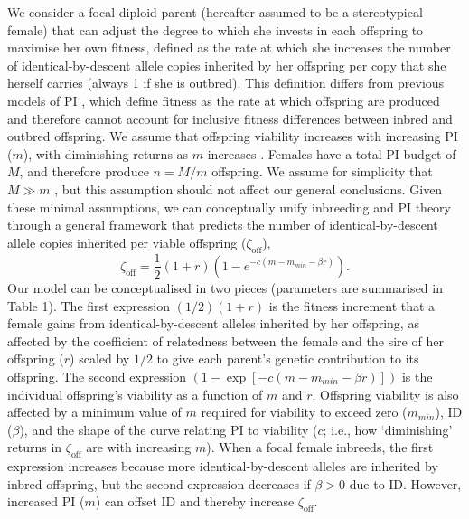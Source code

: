 \documentclass[10pt,letterpaper]{article}
\begin{document}
We consider a focal diploid parent (hereafter assumed to be a stereotypical female) that can adjust the degree to which she invests in each offspring to maximise her own fitness, defined as the rate at which she increases the number of identical-by-descent allele copies inherited by her offspring per copy that she herself carries (always 1 if she is outbred). This definition differs from previous models of PI \cite[e.g.,][]{Macnair1978, Parker1978}, which define fitness as the rate at which offspring are produced and therefore cannot account for inclusive fitness differences between inbred and outbred offspring. We assume that offspring viability increases with increasing PI ($m$), with diminishing returns as $m$ increases \cite[following][]{Parker1978}. Females have a total PI budget of $M$, and therefore produce $n=M/m$ offspring. We assume for simplicity that $M \gg m$ \cite[following][]{Parker1985}, but this assumption should not affect our general conclusions. Given these minimal assumptions, we can conceptually unify inbreeding and PI theory through a general framework that predicts the number of identical-by-descent allele copies inherited per viable offspring ($\zeta_{\textrm{off}}$),
\begin{equation} \label{maineq}
\zeta_{\textrm{off}} = \frac{1}{2}\left(1+r\right)\left(1-e^{-c\left(m-m_{min}-\beta r\right)}\right).
\end{equation}
Our model can be conceptualised in two pieces (parameters are summarised in Table 1). The first expression $\left(1/2\right) \left(1 + r\right)$ is the fitness increment that a female gains from identical-by-descent alleles inherited by her offspring, as affected by the coefficient of relatedness between the female and the sire of her offspring ($r$) scaled by $1/2$ to give each parent's genetic contribution to its offspring. The second expression $\left(1 - \exp\left[-c\left(m-m_{min}-\beta r\right)\right]\right)$ is the individual offspring's viability as a function of $m$ and $r$. Offspring viability is also affected by a minimum value of $m$ required for viability to exceed zero ($m_{min}$), ID ($\beta$), and the shape of the curve relating PI to viability ($c$; i.e., how `diminishing' returns in $\zeta_{\textrm{off}}$ are with increasing $m$). When a focal female inbreeds, the first expression increases because more identical-by-descent alleles are inherited by inbred offspring, but the second expression decreases if $\beta>0$ due to ID. However, increased PI ($m$) can offset ID and thereby increase $\zeta_{\textrm{off}}$.
\end{document}
